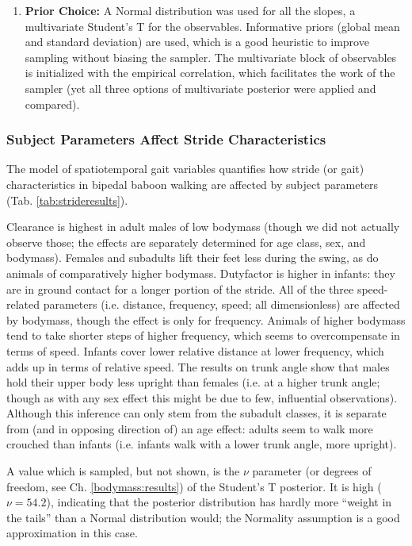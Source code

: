 \begin{enumerate}
\item \textbf{Prior Choice:}
\label{sec:orgffbfe48}
A Normal distribution was used for all the slopes, a multivariate Student's T for the observables.
Informative priors (global mean and standard deviation) are used, which is a good heuristic to improve sampling without biasing the sampler.
The multivariate block of observables is initialized with the empirical correlation, which facilitates the work of the sampler (yet all three options of multivariate posterior were applied and compared).
\end{enumerate}


\subsubsection{Subject Parameters Affect Stride Characteristics}
\label{sec:orge85b957}
The model of spatiotemporal gait variables quantifies how stride (or gait) characteristics in bipedal baboon walking are affected by subject parameters (Tab. \ref{tab:strideresults}).

Clearance is highest in adult males of low bodymass (though we did not actually observe those; the effects are separately determined for age class, sex, and bodymass).
Females and subadults lift their feet less during the swing, as do animals of comparatively higher bodymass.
Dutyfactor is higher in infants: they are in ground contact for a longer portion of the stride.
All of the three speed-related parameters (i.e. distance, frequency, speed; all dimensionless) are affected by bodymass, though the effect is  only for frequency.
Animals of higher bodymass tend to take shorter steps of higher frequency, which seems to overcompensate in terms of speed.
Infants cover lower relative distance at lower frequency, which adds up in terms of relative speed.
The results on trunk angle show that males hold their upper body less upright than females (i.e. at a higher trunk angle; though as with any sex effect this might be due to few, influential observations).
Although this inference can only stem from the subadult classes, it is separate from (and in opposing direction of) an age effect: adults seem to walk more crouched than infants (i.e. infants walk with a lower trunk angle, more upright).

A value which is sampled, but not shown, is the \(\nu\) parameter (or degrees of freedom, see Ch. \ref{bodymass:results}) of the Student's T posterior.
It is high (\(\nu = 54.2\)), indicating that the posterior distribution has hardly more ``weight in the tails'' than a Normal distribution would; the Normality assumption is a good approximation in this case.


